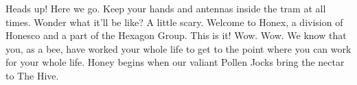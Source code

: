 Heads up! Here we go.
Keep your hands and antennas inside the tram at all times.
Wonder what it'll be like?
A little scary.
Welcome to Honex, a division of Honesco and a part of the Hexagon Group.
This is it!
Wow.
Wow.
We know that you, as a bee, have worked your whole life to get to the point where you can work for your whole life.
Honey begins when our valiant Pollen Jocks bring the nectar to The Hive.